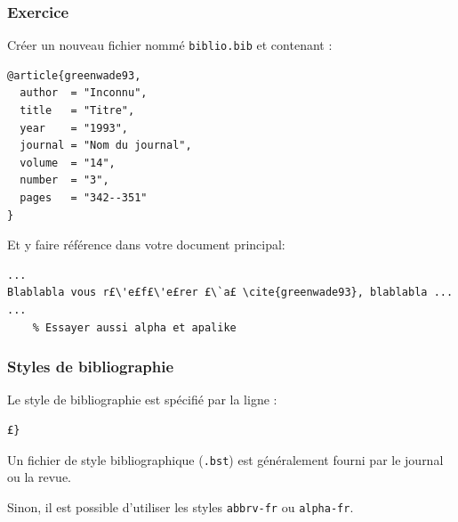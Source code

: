 \documentclass{beamer}
\begin{document}
\begin{frame}[fragile]
\frametitle{Exercice}

Créer un nouveau fichier nommé \texttt{biblio.bib} et contenant :

\begin{lstlisting}
@article{greenwade93,
  author  = "Inconnu",
  title   = "Titre",
  year    = "1993",
  journal = "Nom du journal",
  volume  = "14",
  number  = "3",
  pages   = "342--351"
}
\end{lstlisting}

Et y faire référence dans votre document principal:

\begin{lstlisting}
...
Blablabla vous r£\'e£f£\'e£rer £\`a£ \cite{greenwade93}, blablabla ...
...
    % Essayer aussi alpha et apalike

\end{lstlisting}

\end{frame}


\begin{frame}[fragile]
\frametitle{Styles de bibliographie}

Le style de bibliographie est spécifié par la ligne :

\begin{lstlisting}
£}
\end{lstlisting}

Un fichier de style bibliographique (\texttt{.bst}) est généralement fourni par le journal ou la revue.

Sinon, il est possible d'utiliser les styles \texttt{abbrv-fr} ou \texttt{alpha-fr}.
\end{frame}

\end{document}
